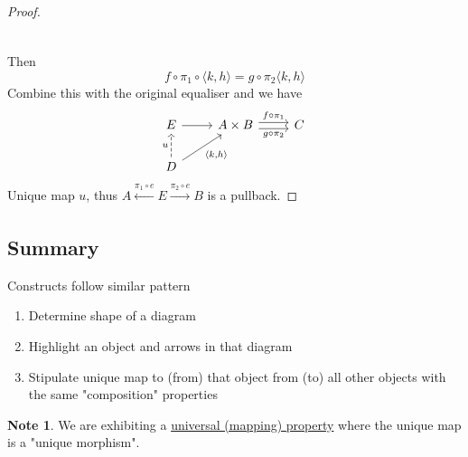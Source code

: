 \documentclass[11pt]{article} %
\theoremstyle{definition}
\theoremstyle{definition}
\theoremstyle{definition}
\newtheorem{note}[theorem]{Note}
\begin{document}
\begin{proof}
\[\begin{tikzcd}
\end{tikzcd}\]
Then 
\[f\circ \pi_1 \circ \langle k, h\rangle = g\circ \pi_2 \langle k, h\rangle\]
Combine this with the original equaliser and we have
\[\begin{tikzcd}
	E & {A\times B} & C \\
	D
	\arrow[from=1-1, to=1-2]
	\arrow["{g\circ\pi_2}"', shift right, from=1-2, to=1-3]
	\arrow["{f\circ \pi_1}", shift left, from=1-2, to=1-3]
	\arrow["u", dashed, from=2-1, to=1-1]
	\arrow["{\langle k,h\rangle}"', from=2-1, to=1-2]
\end{tikzcd}\]
Unique map $u$, thus $A\xleftarrow[]{\pi_1 \circ e}E \xrightarrow[]{\pi_2 \circ e}B$ is a pullback.
\end{proof}

\clearpage
\subsection{Summary}
Constructs follow similar pattern
\begin{enumerate}
    \item Determine shape of a diagram
    \item Highlight an object and arrows in that diagram
    \item Stipulate unique map to (from) that object from (to) all other objects with the same 
    "composition" properties
\end{enumerate}
\begin{note}
    We are exhibiting a \underline{universal (mapping) property} where the unique map is a "unique morphism".
\end{note}

\clearpage
\end{document}
